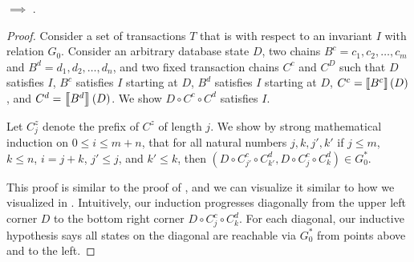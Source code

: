 \begin{claim}\label{clm:istrengthstar-implies-iconfluence}
  \istrengthstar{} $\implies$ \iconfluence{}.
\end{claim}
\begin{proof}
  Consider a set of transactions $T$ that is \istrongstar{} with respect to an
  invariant $I$ with relation $G_0$. Consider an arbitrary database state $D$,
  two \imp{} chains $B^c = c_1, c_2, \ldots, c_m$ and $B^d = d_1, d_2, \ldots,
  d_n$, and two fixed transaction chains $C^c$ and $C^D$ such that $D$
  satisfies $I$, $B^c$ satisfies $I$ starting at $D$, $B^d$ satisfies $I$
  starting at $D$, $C^c = \left\llbracket B^c\right\rrbracket(D)$, and $C^d = \left\llbracket B^d\right\rrbracket(D)$. We
  show $D \circ C^c \circ C^d$ satisfies $I$.

  Let $C^z_j$ denote the prefix of $C^z$ of length $j$. We show by strong
  mathematical induction on $0 \leq i \leq m + n$, that for all natural numbers
  $j, k, j', k'$ if
    $j \leq m$,
    $k \leq n$,
    $i = j + k$,
    $j' \leq j$, and
    $k' \leq k$, then
  $(D \circ C^c_{j'} \circ C^d_{k'}, D \circ C^c_j \circ C^d_k) \in G_0^*$.

  This proof is similar to the proof of , and we can
  visualize it similar to how we visualized  in
  . Intuitively, our induction progresses diagonally from
  the upper left corner $D$ to the bottom right corner $D \circ C^c_j \circ
  C^d_k$. For each diagonal, our inductive hypothesis says all states on the
  diagonal are reachable via $G_0^*$ from points above and to the left.


\end{proof}
